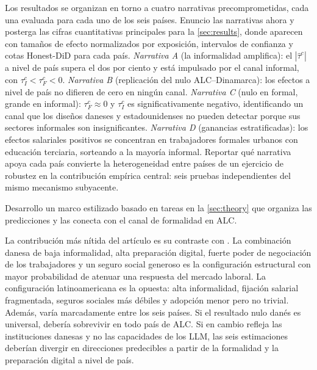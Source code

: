 Los resultados se organizan en torno a cuatro narrativas precomprometidas, cada una evaluada para cada uno de los seis pa\'{i}ses. Enuncio las narrativas ahora y posterga las cifras cuantitativas principales para la \cref{sec:results}, donde aparecen con tama\~{n}os de efecto normalizados por exposici\'{o}n, intervalos de confianza y cotas Honest-DiD para cada pa\'{i}s. \emph{Narrativa A} (la informalidad amplifica): el $|\hat\tau^c|$ a nivel de pa\'{i}s supera el dos por ciento y est\'{a} impulsado por el canal informal, con $\tau_I^c < \tau_F^c < 0$. \emph{Narrativa B} (replicaci\'{o}n del nulo ALC--Dinamarca): los efectos a nivel de pa\'{i}s no difieren de cero en ning\'{u}n canal. \emph{Narrativa C} (nulo en formal, grande en informal): $\tau_F^c \approx 0$ y $\tau_I^c$ es significativamente negativo, identificando un canal que los dise\~{n}os daneses y estadounidenses no pueden detectar porque sus sectores informales son insignificantes. \emph{Narrativa D} (ganancias estratificadas): los efectos salariales positivos se concentran en trabajadores formales urbanos con educaci\'{o}n terciaria, sorteando a la mayor\'{i}a informal. Reportar qu\'{e} narrativa apoya cada pa\'{i}s convierte la heterogeneidad entre pa\'{i}ses de un ejercicio de robustez en la contribuci\'{o}n emp\'{i}rica central: seis pruebas independientes del mismo mecanismo subyacente.

Desarrollo un marco estilizado basado en tareas en la \cref{sec:theory} que organiza las predicciones y las conecta con el canal de formalidad en ALC.

La contribuci\'{o}n m\'{a}s n\'{i}tida del art\'{i}culo es su contraste con \citet{HumlumVestergaard2025_llm}. La combinaci\'{o}n danesa de baja informalidad, alta preparaci\'{o}n digital, fuerte poder de negociaci\'{o}n de los trabajadores y un seguro social generoso es la configuraci\'{o}n estructural con mayor probabilidad de atenuar una respuesta del mercado laboral. La configuraci\'{o}n latinoamericana es la opuesta: alta informalidad, fijaci\'{o}n salarial fragmentada, seguros sociales m\'{a}s d\'{e}biles y adopci\'{o}n menor pero no trivial. Adem\'{a}s, var\'{i}a marcadamente entre los seis pa\'{i}ses. Si el resultado nulo dan\'{e}s es universal, deber\'{i}a sobrevivir en todo pa\'{i}s de ALC. Si en cambio refleja las instituciones danesas y no las capacidades de los LLM, las seis estimaciones deber\'{i}an divergir en direcciones predecibles a partir de la formalidad y la preparaci\'{o}n digital a nivel de pa\'{i}s.

